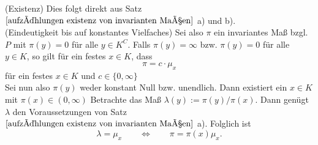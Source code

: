 (Existenz) Dies folgt direkt aus Satz $\ref{aufzählungen existenz von invarianten Maßen}$ a) und b).
\\
(Eindeutigkeit bis auf konstantes Vielfaches) Sei also $\pi$ ein invariantes Maß bzgl. $P$ mit $\pi(y)=0$ für alle $y \in K^{C}$. Falls $\pi(y) = \infty$ bzw. $\pi(y)=0$ für alle $y \in K$, so gilt für ein festes $x \in K$, dass
\begin{equation*}
\pi = c \cdot \mu_{x}
\end{equation*}
für ein festes $x \in K$ und $c \in \lbrace 0, \infty \rbrace$
\\
Sei nun also $\pi(y)$ weder konstant Null bzw. unendlich. Dann existiert ein $x \in K$ mit $\pi(x) \in (0,\infty)$ Betrachte das Maß $\lambda(y):=\pi(y) / \pi(x)$. Dann genügt $\lambda $ den Voraussetzungen von Satz $\ref{aufzählungen existenz von invarianten Maßen}$ a). Folglich ist 
\begin{equation*}
\lambda = \mu_{x} \qquad \Leftrightarrow \qquad \pi = \pi(x)\mu_{x}.
\end{equation*}